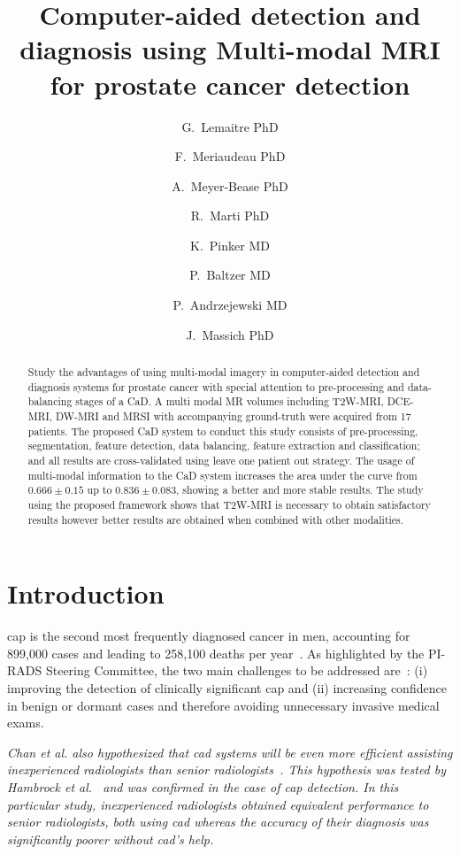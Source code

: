 \documentclass[num-refs]{wiley-article}
\title{Computer-aided detection and diagnosis using Multi-modal MRI for prostate cancer detection}
\author[1\authfn{1}]{G.~Lemaitre PhD}
\author[2\authfn{1}]{F.~Meriaudeau PhD}
\author[2\authfn{1}]{A.~Meyer-Bease PhD}
\author[2\authfn{1}]{R.~Marti PhD}
\author[2\authfn{1}]{K.~Pinker MD}
\author[2\authfn{1}]{P.~Baltzer MD}
\author[2\authfn{1}]{P.~Andrzejewski MD}
\author[1\authfn{1}]{J.~Massich PhD}
\affil[1]{Department, Institution, City, State or Province, Postal Code, Country}
\affil[2]{Department, Institution, City, State or Province, Postal Code, Country}
\begin{document}
\maketitle


\begin{abstract}
    Study the advantages of using multi-modal imagery in computer-aided
    detection and diagnosis systems for prostate cancer with special attention to
    pre-processing and data-balancing stages of a CaD.
%
    A multi modal MR volumes including T2W-MRI, DCE-MRI, DW-MRI and MRSI with
    accompanying ground-truth were acquired from 17 patients. The proposed CaD
    system to conduct this study consists of pre-processing, segmentation, feature
    detection, data balancing, feature extraction and classification;
    and all results are cross-validated using leave one patient out strategy.
%
    The usage of multi-modal information to the CaD system increases the area
    under the curve from $0.666\pm0.15$ up to $0.836\pm0.083$, showing a better
    and more stable results.
%
    The study using the proposed framework shows that T2W-MRI is necessary to
    obtain satisfactory results however better results are obtained when combined
    with other modalities.

\end{abstract}




\section{Introduction}

\Ac{cap} is the second most frequently diagnosed cancer in men, accounting for
899,000 cases and leading to 258,100 deaths per
year~\citep{ferlay2010estimates}. As highlighted by the PI-RADS Steering
Committee, the two main challenges to be addressed are~\citep{weinreb2016pi}:
(i) improving the detection of clinically significant \ac{cap} and (ii)
increasing confidence in benign or dormant cases and therefore avoiding
unnecessary invasive medical exams.

\emph{
Chan et al. also hypothesized that
\acs{cad} systems will be even more efficient assisting inexperienced
radiologists than senior radiologists~\cite{Chan1999}. This hypothesis was
tested by Hambrock et al.~\cite{Hambrock2013} and was confirmed in the case of
\ac{cap} detection. In this particular study, inexperienced radiologists
obtained equivalent performance to senior radiologists, both using \acs{cad}
whereas the accuracy of their diagnosis was significantly poorer without
\acs{cad}'s help.
}
\end{document}
